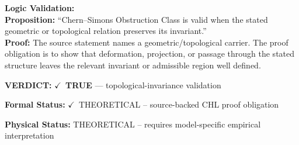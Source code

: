 \textbf{Logic Validation:}\\
\textbf{Proposition:} ``Chern--Simons Obstruction Class is valid when the stated geometric or topological
relation preserves its invariant.''\\
\textbf{Proof:} The source statement names a geometric/topological carrier. The proof obligation is to
show that deformation, projection, or passage through the stated structure leaves the
relevant invariant or admissible region well defined.

\textbf{VERDICT:} \ensuremath{\checkmark}\ \textbf{TRUE} --- topological-invariance validation

\textbf{Formal Status:} \ensuremath{\checkmark}\ THEORETICAL -- source-backed CHL proof obligation

\textbf{Physical Status:} THEORETICAL -- requires model-specific empirical interpretation
\par\vspace{0.45em}
\par
\ifTZPDarkEdition
{}
\fi
\endgroup
\endgroup

